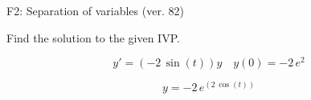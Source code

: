 \begin{exercise}
  \begin{exerciseTitle}F2: Separation of variables (ver. 82)\end{exerciseTitle}
  \begin{exerciseStatement}
    
Find the solution to the given IVP.

    
\[y'=( -2 \, \sin\left(t\right) )y\hspace{1em} y(0)= -2 \, e^{2}\]

  \end{exerciseStatement}
  \begin{exerciseAnswer}
    
\[y= -2 \, e^{\left(2 \, \cos\left(t\right)\right)}\]

  \end{exerciseAnswer}
\end{exercise}